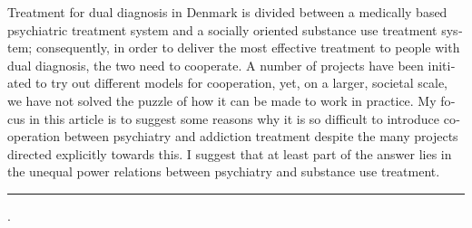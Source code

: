     \begin{adjustwidth}{20mm}{20mm}
\label{paper6:abstract}
    \bigskip
    \begin{otherlanguage}{english}
    {\small

\noindent Treatment for dual diagnosis in Denmark is divided between a medically based psychiatric treatment system and a socially oriented substance use treatment system; consequently, in order to deliver the most effective treatment to people with dual diagnosis, the two need to cooperate. A number of projects have been initiated to try out different models for cooperation, yet, on a larger, societal scale, we have not solved the puzzle of how it can be made to work in practice. My focus in this article is to suggest some reasons why it is so difficult to introduce cooperation between psychiatry and addiction treatment despite the many projects directed explicitly towards this. I suggest that at least part of the answer lies in the unequal power relations between psychiatry and substance use treatment.

\smallskip
\noindent\rule{\linewidth}{1pt}

%
\hspace*{0.75em}{%
dual diagnosis;
cooperation;
organizational interfaces;
power}.








    } %


    \end{otherlanguage}

    \end{adjustwidth}